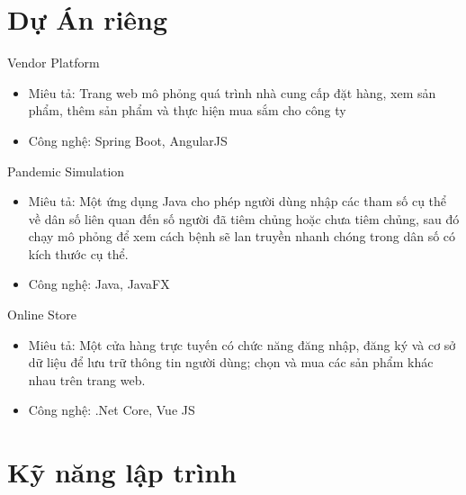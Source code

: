 \documentclass{res}
\newcommand{\inFrench}[1]{}
\newcommand{\inEnglish}[1]{#1}
\begin{document}
\begin{resume}
\inEnglish{
	\section{Dự Án riêng}
}
\vspace{9pt}


\inEnglish{
	{Vendor Platform} 

	\begin{itemize} \itemsep -2pt
		\item {Miêu tả:} Trang web mô phỏng quá trình nhà cung cấp đặt hàng, xem sản phẩm, thêm sản phẩm và thực hiện mua sắm cho công ty
		\item {Công nghệ:} Spring Boot, AngularJS
	\end{itemize}

	{Pandemic Simulation}
	
	\begin{itemize} \itemsep -2pt
		\item  {Miêu tả:} Một ứng dụng Java cho phép người dùng nhập các tham số cụ thể về dân số liên quan đến số người đã tiêm chủng hoặc chưa tiêm chủng, sau đó chạy mô phỏng để xem cách bệnh sẽ lan truyền nhanh chóng trong dân số có kích thước cụ thể.
		\item {Công nghệ:} Java, JavaFX
	\end{itemize}
		
		 {Online Store} 
	\begin{itemize} \itemsep -2pt
		\item  {Miêu tả:} Một cửa hàng trực tuyến có chức năng đăng nhập, đăng ký và cơ sở dữ liệu để lưu trữ thông tin người dùng; chọn và mua các sản phẩm khác nhau trên trang web.
		\item  {Công nghệ:} .Net Core, Vue JS
	\end{itemize}

}

\inFrench{
	\section{Connaissances informatiques}
}
\inEnglish{
	\section{Kỹ năng lập trình}
}
\vspace{6pt}



\end{resume}
\end{document}
